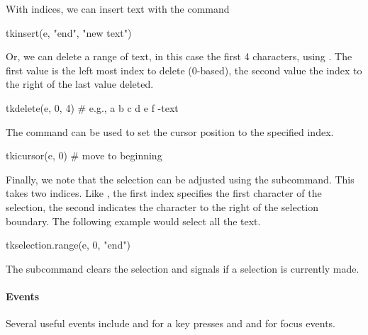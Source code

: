 With indices, we can insert  text with the  command
\begin{Schunk}
\begin{Sinput}
 tkinsert(e, "end", "new text")
\end{Sinput}
\end{Schunk}

Or, we can delete a range of text, in this case the first 4
characters, using . The first value is
the left most index to delete (0-based), the second value the index to
the right of the last value deleted.
\begin{Schunk}
\begin{Sinput}
 tkdelete(e, 0, 4) # e.g.,  a b c d e f   -text
\end{Sinput}
\end{Schunk}

The  command can be used to set the
cursor position to the specified index.
\begin{Schunk}
\begin{Sinput}
 tkicursor(e, 0)                         # move to beginning
\end{Sinput}
\end{Schunk}

Finally, we note that the selection can be adjusted using the
 subcommand. This takes two
indices. Like , the first index specifies the first character of
the selection, the second indicates the character to the right of the
selection boundary. The following example would select all the text.
\begin{Schunk}
\begin{Sinput}
 tkselection.range(e, 0, "end")
\end{Sinput}
\end{Schunk}
The  subcommand clears the selection and  signals if a selection is currently made.

\paragraph{Events}
Several useful events include  and  for a key presses and   and  for focus events.


